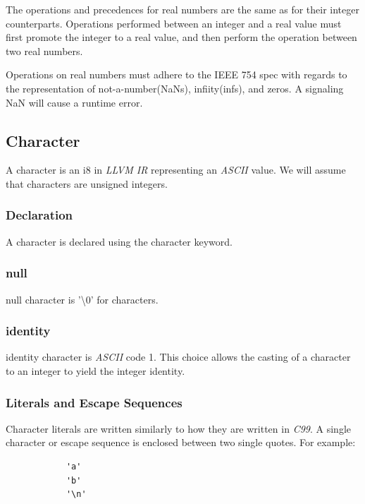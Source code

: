 \documentclass{article}
\begin{document}
		The operations and precedences for real numbers are the same as for their integer counterparts. Operations
		performed between an integer and a real value must first promote the integer to a real value, and then perform
		the operation between two real numbers.

		Operations on real numbers must adhere to the \textsf{IEEE 754} spec with regards to the representation of
		not-a-number(NaNs), infiity(infs), and zeros. A signaling NaN will cause a runtime error.


	\subsection{Character}\label{sec:character}

		A character is an \textsf{i8} in \textit{LLVM IR} representing an \textit{ASCII} value. We will assume that
		characters are unsigned integers.

	\subsubsection{Declaration}

		A character is declared using the \textsf{character} keyword.

	\subsubsection{null}

		\textsf{null} character is \textsf{'\textbackslash0'} for characters.

	\subsubsection{identity}

		\textsf{identity} character is \textit{ASCII} code 1. This choice allows the casting of a character to an
		integer to yield the integer identity.


	\subsubsection{Literals and Escape Sequences}

		Character literals are written similarly to how they are written in \textit{C99}. A single character or escape
		sequence is enclosed between two single quotes. For example:

		\begin{lstlisting}
			'a'
			'b'
			'\n'
		\end{lstlisting}
\end{document}
